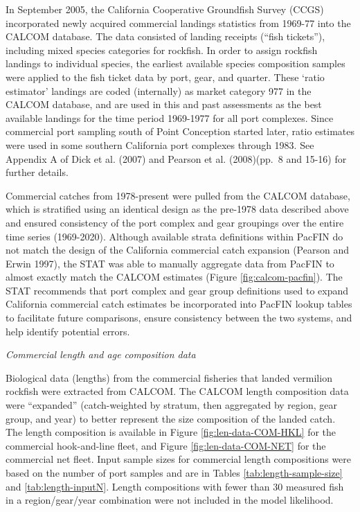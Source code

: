 \documentclass[11pt,
  english,
]{article}
\begin{document}
In September 2005, the California Cooperative Groundfish Survey (CCGS) incorporated newly acquired commercial landings statistics from 1969-77 into the CALCOM database. The data consisted of landing receipts (``fish tickets''), including mixed species categories for rockfish. In order to assign rockfish landings to individual species, the earliest available species composition samples were applied to the fish ticket data by port, gear, and quarter. These `ratio estimator' landings are coded (internally) as market category 977 in the CALCOM database, and are used in this and past assessments as the best available landings for the time period 1969-1977 for all port complexes. Since commercial port sampling south of Point Conception started later, ratio estimates were used in some southern California port complexes through 1983. See Appendix A of Dick et al. {(2007)\leavevmode\tagmcend\tagstructend} and Pearson et al. {(2008)\leavevmode\tagmcend\tagstructend}(pp.~8 and 15-16) for further details.

Commercial catches from 1978-present were pulled from the CALCOM database, which is stratified using an identical design as the pre-1978 data described above and ensured consistency of the port complex and gear groupings over the entire time series (1969-2020). Although available strata definitions within PacFIN do not match the design of the California commercial catch expansion {(Pearson and Erwin 1997)\leavevmode\tagmcend\tagstructend}, the STAT was able to manually aggregate data from PacFIN to almost exactly match the CALCOM estimates (Figure \ref{fig:calcom-pacfin}). The STAT recommends that port complex and gear group definitions used to expand California commercial catch estimates be incorporated into PacFIN lookup tables to facilitate future comparisons, ensure consistency between the two systems, and help identify potential errors.

\emph{Commercial length and age composition data}

Biological data (lengths) from the commercial fisheries that landed vermilion rockfish were extracted from CALCOM. The CALCOM length composition data were ``expanded'' (catch-weighted by stratum, then aggregated by region, gear group, and year) to better represent the size composition of the landed catch. The length composition is available in Figure \ref{fig:len-data-COM-HKL} for the commercial hook-and-line fleet, and Figure \ref{fig:len-data-COM-NET} for the commercial net fleet. Input sample sizes for commercial length compositions were based on the number of port samples and are in Tables \ref{tab:length-sample-size} and \ref{tab:length-inputN}. Length compositions with fewer than 30 measured fish in a region/gear/year combination were not included in the model likelihood.
\end{document}
